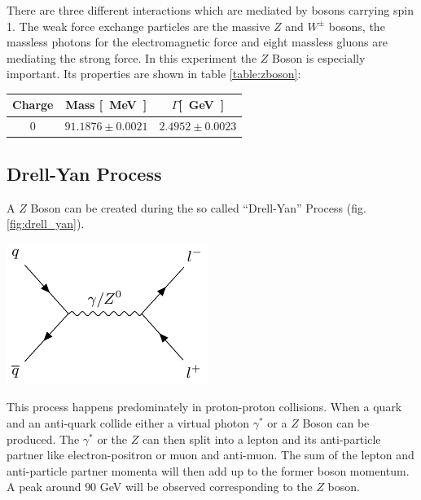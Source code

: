 \documentclass[12pt, a4paper, bibliography=totoc]{scrartcl}
\begin{document}
\begin{multicols}{2}
There are three different interactions which are mediated by bosons carrying spin 1.
    The weak force exchange particles are the massive $Z$ and $W^{\pm}$ bosons, the massless photons for the electromagnetic force and eight massless gluons are mediating the strong force. 
    In this experiment the $Z$ Boson is especially important. Its properties are shown in table \ref{table:zboson}:
        \begin{center}
            \begin{tabular*}{\linewidth}{c c c}
        \toprule
                Charge & Mass \si{[MeV]} & $\Gamma$\si{[GeV]}\\%
        \midrule
                \small{0} & \small {$91.1876 \pm 0.0021$} & \small{$2.4952 \pm 0.0023$} \\
        \bottomrule
    \end{tabular*}
        \label{table:zboson}
        \end{center}


\subsection{Drell-Yan Process}
A $Z$ Boson can be created during the so called ``Drell-Yan'' Process (fig. \ref{fig:drell_yan}). 

    \begin{center}
\includegraphics[width=0.55\linewidth]{fig/feynman_0.pdf}
\label{fig:drell_yan}
\end{center}

This process happens predominately in proton-proton collisions.
When a quark and an anti-quark collide either a virtual photon $\gamma^\ast$ or a $Z$ Boson can be produced. 
The $\gamma^\ast$ or the $Z$ can then split into a lepton and its anti-particle partner like electron-positron or muon and anti-muon.
The sum of the lepton and anti-particle partner momenta will then add up to the former boson momentum. 
A peak around $90$ \si{GeV} will be observed corresponding to the $Z$ boson. 


\end{multicols}
\end{document}
